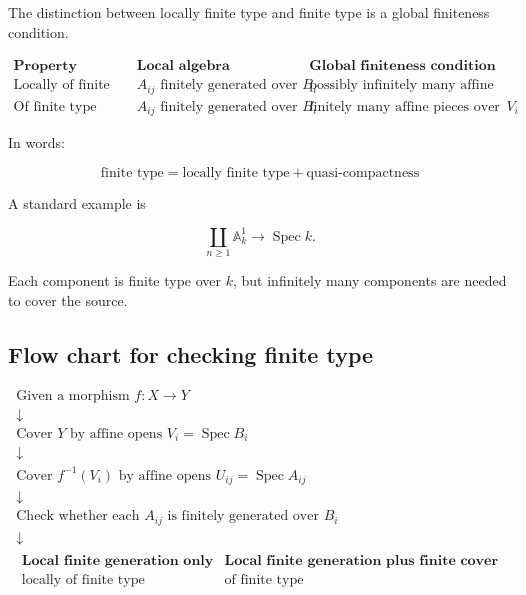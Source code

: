 \documentclass[12pt,a4paper]{article}
\theoremstyle{notespace}
\begin{document}
The distinction between locally finite type and finite type is a global finiteness condition.

\[
\begin{array}{c|c|c}
	\textbf{Property}
	&
	\textbf{Local algebra condition}
	&
	\textbf{Global finiteness condition}
	\\
	\hline
	\text{Locally of finite type}
	&
	A_{ij}\text{ finitely generated over }B_i
	&
	\text{possibly infinitely many affine pieces}
	\\[5pt]
	\text{Of finite type}
	&
	A_{ij}\text{ finitely generated over }B_i
	&
	\text{finitely many affine pieces over each }V_i
\end{array}
\]

In words:

\[
\boxed{
	\text{finite type}
	=
	\text{locally finite type}
	+
	\text{quasi-compactness}
}
\]

A standard example is

\[
\coprod_{n\geq 1}\mathbb A_k^1
\longrightarrow
\operatorname{Spec} k.
\]

Each component is finite type over \(k\), but infinitely many components are needed to cover the source.

\subsection{Flow chart for checking finite type}

\[
\begin{array}{c}
	\text{Given a morphism } f:X\to Y
	\\[6pt]
	\downarrow
	\\[6pt]
	\text{Cover }Y\text{ by affine opens }V_i=\operatorname{Spec}B_i
	\\[6pt]
	\downarrow
	\\[6pt]
	\text{Cover }f^{-1}(V_i)\text{ by affine opens }U_{ij}=\operatorname{Spec}A_{ij}
	\\[6pt]
	\downarrow
	\\[6pt]
	\text{Check whether each }A_{ij}\text{ is finitely generated over }B_i
	\\[6pt]
	\downarrow
	\\[6pt]
	\begin{array}{c|c}
		\textbf{Local finite generation only}
		&
		\textbf{Local finite generation plus finite cover}
		\\
		\hline
		\text{locally of finite type}
		&
		\text{of finite type}
	\end{array}
\end{array}
\]
\end{document}
